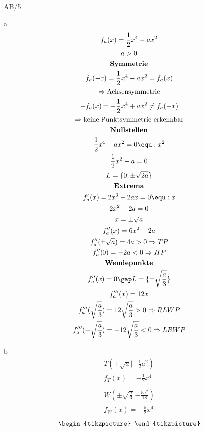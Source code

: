 \begin{exercise}{AB/5}
  \item [a]
  \begin{gather*}
    f_a(x) = \frac{1}{2}x^4 - ax^2 \\
    a > 0 \\
    \textbf{Symmetrie} \\
    f_a(-x) = \frac{1}{2}x^4 - ax^2 = f_a(x) \\
    \Rightarrow \text{Achsensymmetrie} \\
    -f_a(x) = -\frac{1}{2}x^4 + ax^2 \neq f_a(-x) \\
    \Rightarrow \text{keine Punktsymmetrie erkennbar} \\
    \textbf{Nullstellen} \\
    \frac{1}{2}x^4 - ax^2 = 0 \equ :x^2 \\
    \frac{1}{2}x^2 - a = 0 \\
    L = \{0; \pm\sqrt{2a}\} \\
    \textbf{Extrema} \\
    f_a'(x) = 2x^3 - 2ax = 0 \equ :x \\
    2x^2 - 2a = 0 \\
    x = \pm\sqrt{a} \\
    f_a''(x) = 6x^2 - 2a \\
    f_a''(\pm\sqrt{a}) = 4a > 0 \Rightarrow TP \\
    f_a''(0) = -2a < 0 \Rightarrow HP \\
    \textbf{Wendepunkte} \\
    f_a''(x) = 0 \gap L = \{\pm\sqrt{\frac{a}{3}}\} \\
    f_a'''(x) = 12x \\
    f_a'''(\sqrt{\frac{a}{3}}) = 12\sqrt{\frac{a}{3}} > 0 \Rightarrow RLWP \\
    f_a'''(-\sqrt{\frac{a}{3}}) = -12\sqrt{\frac{a}{3}} < 0 \Rightarrow LRWP
  \end{gather*}
  \item [b]
  \begin{gather*}
    T(\pm\sqrt{a}|-\frac{1}{2}a^2) \\
    f_T(x) = -\frac{1}{2}x^4 \\\\
    W(\pm\sqrt{\frac{a}{3}}|-\frac{5a^2}{18}) \\
    f_W(x) = -\frac{5}{2}x^4
  \end{gather*}
  \begin{gather*}
    \begin{tikzpicture}

\end{tikzpicture}
\end{gather*}
\end{exercise}
